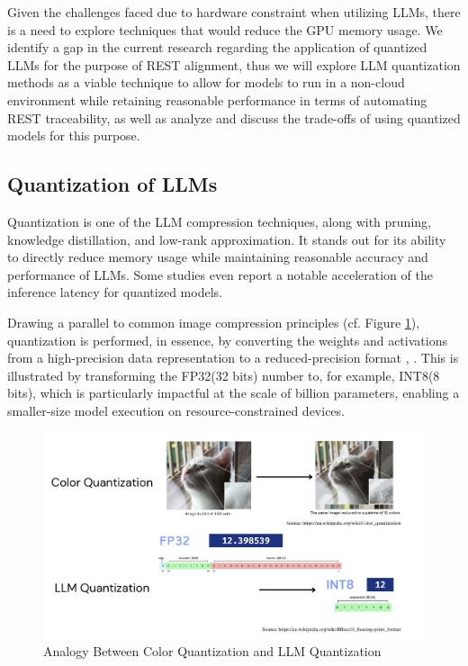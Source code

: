 \documentclass[conference]{IEEEtran}
\begin{document}

Given the challenges faced due to hardware constraint when utilizing LLMs, there
is a need to explore techniques that would reduce the GPU memory usage. We
identify a gap in the current research regarding the application of quantized
LLMs for the purpose of REST alignment, thus we will explore LLM quantization
methods as a viable technique to allow for models to run in a non-cloud
environment while retaining reasonable performance in terms of automating REST
traceability, as well as analyze and discuss the trade-offs of using quantized
models for this purpose.


\subsection{Quantization of LLMs}

Quantization is one of the LLM compression techniques, along with pruning, knowledge distillation, and low-rank approximation\cite{bai2024beyond}. It stands out for its ability to directly reduce memory usage while maintaining reasonable accuracy and performance of LLMs. Some studies even report a notable acceleration of the inference latency for quantized models\cite{shen2024exploring}.

Drawing a parallel to common image compression principles (cf. Figure \ref{fig:quantvisual}), quantization is performed, in essence, by converting the weights and activations from a high-precision data representation to a reduced-precision format \cite{zhao2025benchmarking}, \cite{bai2024beyond}. This is illustrated by transforming the FP32(32 bits) number to, for example, INT8(8 bits), which is particularly impactful at the scale of billion parameters, enabling a smaller-size model execution on resource-constrained devices.

\begin{figure}
    \flushleft
    \includegraphics[width=\columnwidth]{img}
    \caption{Analogy Between Color Quantization and LLM Quantization}
    \label{fig:quantvisual}
\end{figure}
\end{document}
